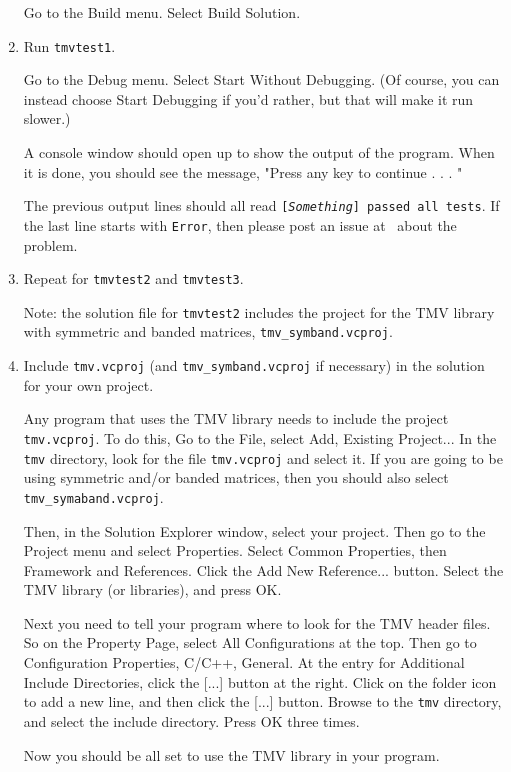 \begin{enumerate}
Go to the Build menu.  Select Build Solution.

\item 
Run \texttt{tmvtest1}.

Go to the Debug menu.  Select Start Without Debugging.  (Of course, you can instead
choose Start Debugging if you'd rather, but that will make it run slower.)

A console window should open up to show the output of the program.  
When it is done, you should see the message,
"Press any key to continue . . . "

The previous output lines should all read \texttt{[{\em Something}] passed all tests}.
If the last line starts with \texttt{Error}, 
then please post an issue at \myissues\ about the problem.

\item
Repeat for \texttt{tmvtest2} and \texttt{tmvtest3}.  

Note: the solution file for \texttt{tmvtest2} includes the
project for the TMV library with symmetric and banded matrices, \texttt{tmv\_symband.vcproj}.

\item
Include \texttt{tmv.vcproj} (and \texttt{tmv\_symband.vcproj} if necessary) in the solution for your own project.

Any program that uses the TMV library needs to include the project \texttt{tmv.vcproj}.  To do this,
Go to the File, select Add, Existing Project...
In the \texttt{tmv\tmvversion} directory, look for the file
\texttt{tmv.vcproj} and select it.  If you are going to be using symmetric and/or banded matrices,
then you should also select \texttt{tmv\_symaband.vcproj}.

Then, in the Solution Explorer window, select your project.  Then go to the Project menu
and select Properties.  Select Common Properties, then Framework and References.  
Click the Add New Reference... button.  Select the TMV library (or libraries), and press OK.

Next you need to tell your program where to look for the TMV header files.  So on the Property Page,
select All Configurations at the top.  Then go to Configuration Properties, C/C++, General.
At the entry for Additional Include Directories, click the [...] button at the right.  Click on the folder icon
to add a new line, and then click the [...] button.  Browse to the 
\texttt{tmv\tmvversion} directory, and select the include directory.  Press OK three times.

Now you should be all set to use the TMV library in your program.

\end{enumerate}

